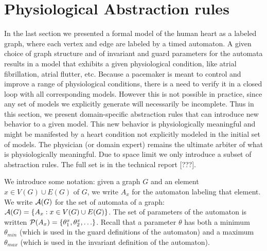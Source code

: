 \section{Physiological Abstraction rules}
\label{abstractionRules}
In the last section we presented a formal model of the human heart as a labeled graph, where each vertex and edge are labeled by a timed automaton.
A given choice of graph structure and of invariant and guard parameters for the automata results in a model that exhibits a given physiological condition, like atrial fibrillation, atrial flutter, etc.
Because a pacemaker is meant to control and improve a range of physiological conditions, there is a need to verify it in a closed loop with all corresponding models.
However this is not possible in practice, since any set of models we explicitly generate will necessarily be incomplete. 
Thus in this section, we present domain-specific abstraction rules that can introduce new behavior to a given model. 
This new behavior is physiologically meaningful and might be manifested by a heart condition not explicitly modeled in the initial set of models.
The physician (or domain expert) remains the ultimate arbiter of what is physiologically meaningful.
Due to space limit we only introduce a subset of abstraction rules. 
The full set is in the technical report [???].

We introduce some notation: given a graph $G$ and an element $x \in V(G) \cup E(G)$ of $G$, we write $A_x$ for the automaton labeling that element.
We write $\mathcal{A}(G)$ for the set of automata of a graph: $\mathcal{A}(G) = \{A_x : x \in V(G) \cup E(G)\}$.
The set of parameters of the automaton is written $\mathcal{P}(A_x) = \{\theta_1^x,\theta_2^x,\ldots\}$. 
Recall that a parameter $\theta$ has both a minimum $\theta_{min}$ (which is used in the guard definitions of the automaton) and a maximum $\theta_{max}$ (which is used in the invariant definition of the automaton).

